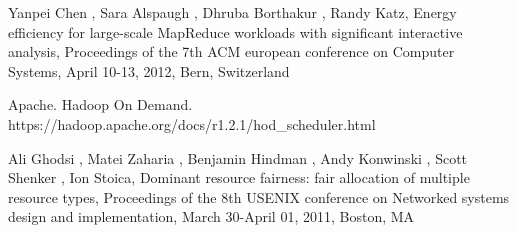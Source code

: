 \documentclass[UTF8,a4paper]{ctexart}
\begin{document}
\begin{thebibliography}{0}
    Yanpei Chen , Sara Alspaugh , Dhruba Borthakur , Randy Katz, Energy efficiency for large-scale MapReduce workloads with significant interactive analysis, Proceedings of the 7th ACM european conference on Computer Systems, April 10-13, 2012, Bern, Switzerland

    Apache. Hadoop On Demand. https://hadoop.apache.org/docs/r1.2.1/hod\_scheduler.html

    Ali Ghodsi , Matei Zaharia , Benjamin Hindman , Andy Konwinski , Scott Shenker , Ion Stoica, Dominant resource fairness: fair allocation of multiple resource types, Proceedings of the 8th USENIX conference on Networked systems design and implementation, March 30-April 01, 2011, Boston, MA

\end{thebibliography}
\end{document}
